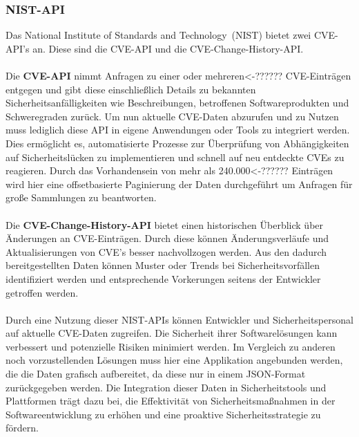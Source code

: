 \subsubsection{NIST-API} \label{sec:NIST-API}
Das \glqq National Institute of Standards and Technology\grqq~(NIST) bietet zwei CVE-API's an.
Diese sind die CVE-API und die CVE-Change-History-API.
\\ \\
Die \textbf{CVE-API} nimmt Anfragen zu einer oder mehreren<-?????? CVE-Einträgen entgegen und gibt diese einschließlich Details zu bekannten Sicherheitsanfälligkeiten wie Beschreibungen, betroffenen Softwareprodukten und Schweregraden zurück.
Um nun aktuelle CVE-Daten abzurufen und zu Nutzen muss lediglich diese API in eigene Anwendungen oder Tools zu integriert werden.
Dies ermöglicht es, automatisierte Prozesse zur Überprüfung von Abhängigkeiten auf Sicherheitslücken zu implementieren und schnell auf neu entdeckte CVEs zu reagieren.
Durch das Vorhandensein von mehr als 240.000<-?????? Einträgen wird hier eine offsetbasierte Paginierung der Daten durchgeführt um Anfragen für große Sammlungen zu beantworten.
\\ \\
Die \textbf{CVE-Change-History-API} bietet einen historischen Überblick über Änderungen an CVE-Einträgen.
Durch diese können Änderungsverläufe und Aktualisierungen von CVE's besser nachvollzogen werden.
Aus den dadurch bereitgestellten Daten können Muster oder Trends bei Sicherheitsvorfällen identifiziert werden und entsprechende Vorkerungen seitens der Entwickler getroffen werden.
\\ \\
Durch eine Nutzung dieser NIST-APIs können Entwickler und Sicherheitspersonal auf aktuelle CVE-Daten zugreifen.
Die Sicherheit ihrer Softwarelösungen kann verbessert und potenzielle Risiken minimiert werden.
Im Vergleich zu anderen noch vorzustellenden Lösungen muss hier eine Applikation angebunden werden, die die Daten grafisch aufbereitet, da diese nur in einem JSON-Format zurückgegeben werden. 
Die Integration dieser Daten in Sicherheitstools und Plattformen trägt dazu bei, die Effektivität von Sicherheitsmaßnahmen in der Softwareentwicklung zu erhöhen und eine proaktive Sicherheitsstrategie zu fördern.



